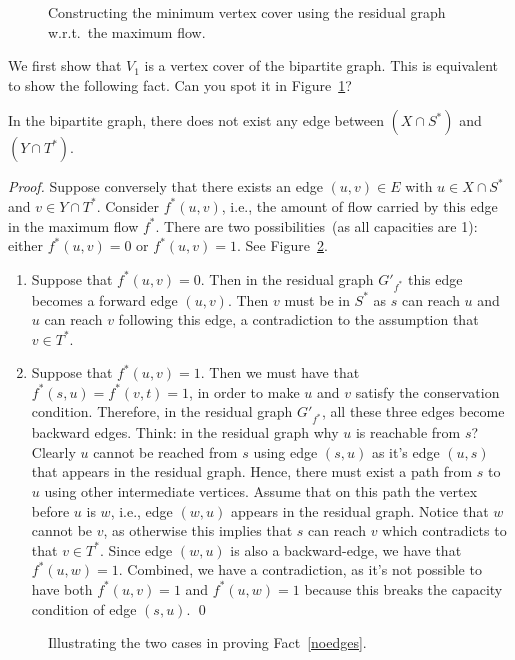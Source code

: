 \begin{figure}[h]
\centering{}
\caption{Constructing the minimum vertex cover using the residual graph w.r.t.\ the maximum flow.}
\label{fig:residual}
\end{figure}

We first show that $V_1$ is a vertex cover of the bipartite graph. This is equivalent to show
the following fact.  Can you spot it in Figure~\ref{fig:residual}?
\begin{fact} \label{noedges}
In the bipartite graph, there does not exist any edge between $(X\cap S^*)$ and $(Y\cap T^*)$. 
\end{fact}
\emph{Proof.} Suppose conversely that there exists an edge $(u,v)\in E$ with $u\in X\cap S^*$ and $v\in Y\cap T^*$.
Consider $f^*(u,v)$, i.e., the amount of flow carried by this edge in the maximum flow $f^*$.
There are two possibilities~(as all capacities are 1): either $f^*(u,v) = 0$ or $f^*(u,v) = 1$. See Figure~\ref{fig:matching-proof}.
\vspace*{-\topsep}
\begin{enumerate}
\item Suppose that $f^*(u,v) = 0$. Then in the residual graph $G'_{f^*}$ this edge becomes a forward edge $(u,v)$.
Then $v$ must be in $S^*$ as $s$ can reach $u$ and $u$ can reach $v$ following this edge, a contradiction
to the assumption that $v\in T^*$.
\item Suppose that $f^*(u,v) = 1$. Then we must have that $f^*(s,u) = f^*(v,t) = 1$, in order to make $u$ and $v$ satisfy
the conservation condition. Therefore, in the residual graph $G'_{f^*}$, all these three edges become backward edges.
Think: in the residual graph why $u$ is reachable from $s$?
Clearly $u$ cannot be reached from $s$ using edge $(s,u)$ as it's edge $(u,s)$ that appears in the residual graph.
Hence, there must exist a path from $s$ to $u$ using other intermediate vertices.
Assume that on this path the vertex before $u$ is $w$, i.e., edge $(w,u)$ appears in the residual graph.
Notice that $w$ cannot be $v$, as otherwise this implies that $s$ can reach $v$ which contradicts to that $v\in T^*$.
Since edge $(w,u)$ is also a backward-edge, we have that $f^*(u,w) = 1$.
Combined, we have a contradiction, as it's not possible to have both $f^*(u,v) = 1$ and $f^*(u,w) = 1$
because this breaks the capacity condition of edge $(s,u)$. \qed
\end{enumerate}

\begin{figure}[t]
\centering{}
\caption{Illustrating the two cases in proving Fact~\ref{noedges}.}
\label{fig:matching-proof}
\end{figure}

